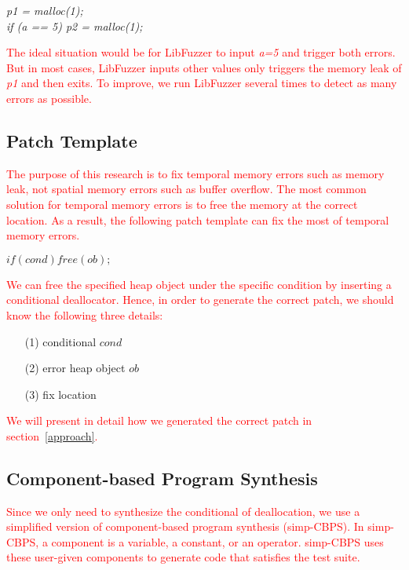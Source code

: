 \documentclass[a4j,dvipdfmx]{article}
\begin{document}
\begin{minipage}{\textwidth}
    \vspace{0.2cm}
    \textsl{\hspace{0.3cm}p1 = malloc(1);\\\hspace{0.3cm}if (a == 5) p2 = malloc(1);\\}
\end{minipage}
\textcolor{red}{
The ideal situation would be for LibFuzzer to input {\it a=5} and trigger both errors. But in most cases,  LibFuzzer inputs other values only triggers the memory leak of {\it p1} and then exits. To improve, we run LibFuzzer several times to detect as many errors as possible.
}

\subsection{Patch Template}
\textcolor{red}{
The purpose of this research is to fix temporal memory errors such as memory leak, not spatial memory errors such as buffer overflow. The most common solution for temporal memory errors is to free the memory at the correct location. As a result, the following patch template can fix the most of temporal memory errors.
}

\begin{minipage}{\textwidth}
    \vspace{0.2cm}
    \textsl{\hspace{0.3cm}$if ( cond ) free ( ob );$\\}
\end{minipage}
\textcolor{red}{
We can free the specified heap object under the specific condition by inserting a conditional deallocator. Hence, in order to generate the correct patch, we should know the following three details:}
\begin{itemize}
  \item[(1)] conditional $cond$
  \item[(2)] error heap object $ob$
  \item[(3)] fix location
\end{itemize}
\textcolor{red}{
We will present in detail how we generated the correct patch in section~\ref{approach}.
 }

\subsection{Component-based Program Synthesis}
\textcolor{red}{
Since we only need to synthesize the conditional of deallocation, we use a simplified version of component-based program synthesis (simp-CBPS). In simp-CBPS, a component is a variable, a constant, or an operator. simp-CBPS uses these user-given components to generate code that satisfies the test suite. }
\end{document}
